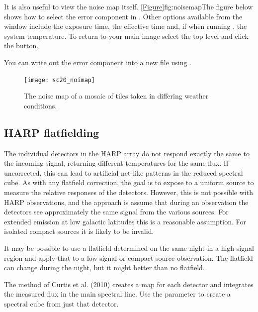 \documentclass[11pt,oneside,chapters]{starlink}
\begin{document}
It is also useful to view the noise map itself.
\cref{Figure}{fig:noisemap}{The figure below} shows how to select the
error component in \gaia. Other options available from the
 window include the exposure
time, the effective time and, if  when running
\makecube, the system temperature. To return to your main image select
the top level and click the  button.

\begin{tip}
You can write out the error component into a new file using
\ndfcopy.
\begin{terminalv}
\end{terminalv}
\end{tip}


\begin{figure}[h!]
\begin{center}
\texttt{[image: sc20\_noimap]}
\caption[The noise map of a mosaic of tiles.]{\label{fig:noisemap}
  The noise map of a mosaic of tiles taken in differing weather
  conditions.}
\end{center}
\end{figure}


\subsection{HARP flatfielding}
\label{sec:flatfield}

The individual detectors in the HARP array do not respond exactly the
same to the incoming signal, returning different temperatures for the
same flux.  If uncorrected, this can lead to artificial net-like
patterns in the reduced spectral cube.  As with any flatfield
correction, the goal is to expose to a uniform source to measure the
relative responses of the detectors.  However, this is not possible
with HARP observations, and the approach is assume that during an
observation the detectors see approximately the same signal from the
various sources.  For extended emission at low galactic latitudes this
is a reasonable assumption.  For isolated compact sources it is likely
to be invalid.

It may be possible to use a flatfield determined on the same night
in a high-signal region and apply that to a low-signal or
compact-source observation.  The flatfield can change during the
night, but it might better than no flatfield.

The method of Curtis et al. (2010)\cite{flat} creates a map for each detector
and integrates the measured flux in the main spectral line.  Use the
 parameter to create a spectral cube from just that
detector.
\end{document}
